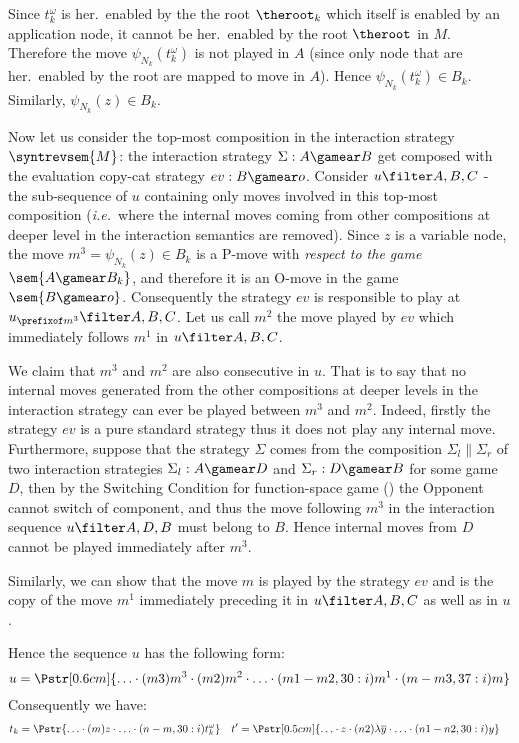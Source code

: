 \begin{itemize}[$\bullet$]
\begin{enumerate}
\begin{itemize}
\begin{enumerate}[(a)]
        Since $t_k^\omega$ is her.\ enabled by the the root $\theroot_k$ which itself is enabled by an application node, it cannot be her.\ enabled by the root $\theroot$ in $M$. Therefore the move $\psi_{N_k}(t_k^\omega)$ is not played in $A$ (since only node that are her.\ enabled by the root are mapped to move in $A$). Hence $\psi_{N_k}(t_k^\omega) \in B_k$. Similarly, $\psi_{N_k}(z) \in B_k$.

        Now let us consider the top-most composition in the interaction strategy $\syntrevsem{M}$: the interaction strategy $\Sigma: A \gamear B$ get composed with the evaluation copy-cat strategy $ev:B \gamear o$. Consider $ u \filter A,B,C$ - the sub-sequence of $u$ containing only moves involved in this top-most composition ({\it i.e.}\ where the internal moves coming from other compositions at deeper level in the interaction semantics are removed). Since $z$ is a variable node, the move $m^3 = \psi_{N_k}(z) \in B_k$ is a P-move with \emph{respect to the game} $\sem{A \gamear B_k}$, and therefore it is an O-move in the game $\sem{B \gamear o}$. Consequently the strategy $ev$ is responsible to play at $u_{\prefixof m^3} \filter A, B, C$. Let us call $m^2$ the move played by $ev$ which immediately follows $m^1$ in $u\filter A,B,C$.

        We claim that $m^3$ and $m^2$ are also consecutive in $u$. That is to say that no internal moves generated from the        other compositions at deeper levels in the interaction strategy can ever be played between $m^3$ and $m^2$. Indeed, firstly the strategy $ev$ is a pure standard strategy thus it does not play any internal move. Furthermore, suppose that the strategy $\Sigma$ comes from the composition $\Sigma_l \| \Sigma_r$ of two interaction strategies $\Sigma_l: A \gamear D$ and $\Sigma_r: D\gamear B$ for some game $D$, then by the Switching Condition for function-space game (\cite{hylandong_pcf}) the Opponent cannot switch of component, and thus the move following $m^3$ in the interaction sequence $u \filter A,D,B$ must belong to $B$. Hence internal moves from $D$ cannot be played immediately after $m^3$.

        Similarly, we can show that the move $m$ is played by the strategy $ev$ and is the copy of the move $m^1$ immediately preceding it in $u\filter A,B,C$ as well as in $u$.

        Hence the sequence $u$ has the following form:
        $$u = \Pstr[0.6cm]{ \ldots \cdot (m3){m^3} \cdot
                    (m2){m^2} \cdot \ldots \cdot
                    (m1-m2,30:i){m^1} \cdot (m-m3,37:i){m} } $$
        Consequently we have:
        \begin{align*}
        t_k &= \Pstr{ \ldots \cdot (m)z \cdot \ldots \cdot (n-m,30:i){t_k^\omega} }  &
        t'&= \Pstr[0.5cm]{ \ldots \cdot z \cdot (n2){\lambda \overline{y}} \cdot \ldots \cdot (n1-n2,30:i){y} }
        \end{align*}


\end{enumerate}
\end{itemize}
\end{enumerate}
\end{itemize}
